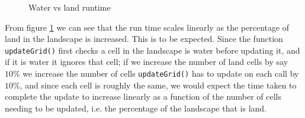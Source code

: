 \begin{figure}
\centering
{}
\caption{Water vs land runtime}
\label{fig:watervslandgraph}
\end{figure}

From figure \ref{fig:watervslandgraph} we can see that the run time scales linearly as the percentage of land in the landscape is increased. This is to be expected. Since the function \texttt{updateGrid()} first checks a cell in the landscape is water before updating it, and if it is water it ignores that cell; if we increase the number of land cells by say $10\%$ we increase the number of cells \texttt{updateGrid()} has to update on each call by $10\%$, and since each cell is roughly the same, we would expect the time taken to complete the update to increase linearly as a function of the number of cells needing to be updated, i.e. the percentage of the landscape that is land.

